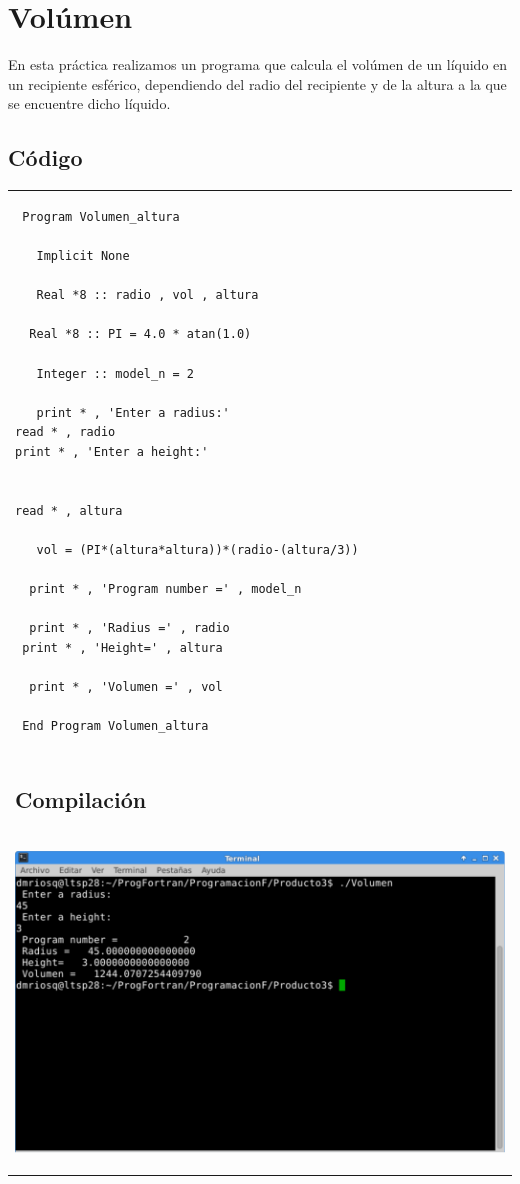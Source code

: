 \documentclass[10pt]{article}
\begin{document}
\section{Volúmen}
En esta práctica realizamos un programa que calcula el volúmen de un líquido en un recipiente esférico, dependiendo del radio del recipiente y de la altura a la que se encuentre dicho líquido.


\subsection{Código}
\begin{tabular}{l}
\begin{verbatim}  
 Program Volumen_altura 

   Implicit None 

   Real *8 :: radio , vol , altura 

  Real *8 :: PI = 4.0 * atan(1.0) 

   Integer :: model_n = 2 

   print * , 'Enter a radius:'
read * , radio 
print * , 'Enter a height:'

    
read * , altura

   vol = (PI*(altura*altura))*(radio-(altura/3))

  print * , 'Program number =' , model_n 

  print * , 'Radius =' , radio 
 print * , 'Height=' , altura
   
  print * , 'Volumen =' , vol 

 End Program Volumen_altura
\end{verbatim} \\
\subsection{Compilación}\\

\begin{center}
   \includegraphics[scale=0.4]{V}
\end{center}
\end{tabular}
\end{document}
